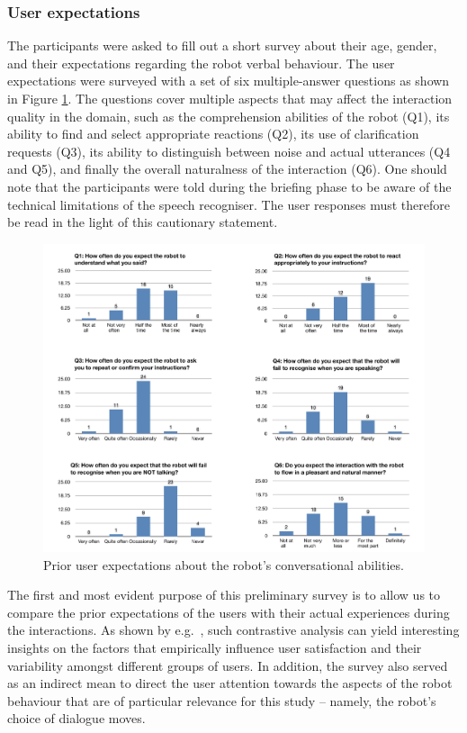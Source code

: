 \subsubsection*{User expectations}

The participants were asked to fill out a short survey about their age, gender, and their expectations regarding the robot verbal behaviour. The user expectations were surveyed with a set of six multiple-answer questions as shown in Figure \ref{fig:expectations}. The questions cover multiple aspects that may affect the interaction quality in the domain, such as the comprehension abilities of the robot (Q1), its ability to find and select appropriate reactions (Q2), its use of clarification requests (Q3), its ability to distinguish between noise and actual utterances (Q4 and Q5), and finally the overall naturalness of the interaction (Q6). One should note that the participants were told during the briefing phase to be aware of the technical limitations of the speech recogniser. The user responses must therefore be read in the light of this cautionary statement. 


\begin{figure}[ht]
\begin{center}
\includegraphics[scale=0.5]{imgs/expectations.pdf}
\end{center} 
\caption{Prior user expectations about the robot's conversational abilities.}
\label{fig:expectations}
\end{figure}

The first and most evident purpose of this preliminary survey is to allow us to compare the prior expectations of the users with their actual experiences during the interactions.  As shown by e.g.\ \cite{JokinenH06}, such contrastive analysis can yield interesting insights on the factors that empirically influence user satisfaction and their variability amongst different groups of users.  In addition, the survey also served as an indirect mean to direct the user attention towards the aspects of the robot behaviour that are of particular relevance for this study -- namely, the robot's choice of dialogue moves. 


